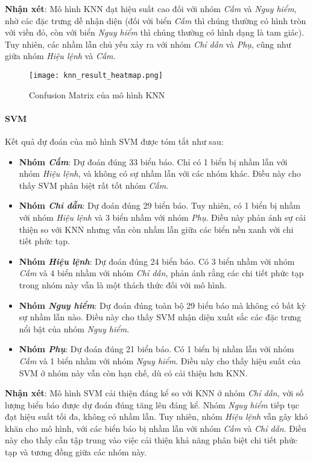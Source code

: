 \documentclass[a4paper,12pt]{article}
\begin{document}
\textbf{Nhận xét}:  
Mô hình KNN đạt hiệu suất cao đối với nhóm \textit{Cấm} và \textit{Nguy hiểm}, nhờ các đặc trưng dễ nhận diện (đối với biển \textit{Cấm} thì chúng thường có hình tròn với viền đỏ, còn với biển \textit{Nguy hiểm} thì chúng thường có hình dạng là tam giác). Tuy nhiên, các nhầm lẫn chủ yếu xảy ra với nhóm \textit{Chỉ dẫn} và \textit{Phụ}, cũng như giữa nhóm \textit{Hiệu lệnh} và \textit{Cấm}.

\begin{figure}[H]
    \centering
    \texttt{[image: knn\_result\_heatmap.png]}
    \caption{Confusion Matrix của mô hình KNN}
    \label{fig:knn_confusion_matrix}
\end{figure}

\paragraph{SVM}  
Kết quả dự đoán của mô hình SVM được tóm tắt như sau:
\begin{itemize}
    \item \textbf{Nhóm \textit{Cấm}}: Dự đoán đúng 33 biển báo. Chỉ có 1 biển bị nhầm lẫn với nhóm \textit{Hiệu lệnh}, và không có sự nhầm lẫn với các nhóm khác. Điều này cho thấy SVM phân biệt rất tốt nhóm \textit{Cấm}.
    \item \textbf{Nhóm \textit{Chỉ dẫn}}: Dự đoán đúng 29 biển báo. Tuy nhiên, có 1 biển bị nhầm với nhóm \textit{Hiệu lệnh} và 3 biển nhầm với nhóm \textit{Phụ}. Điều này phản ánh sự cải thiện so với KNN nhưng vẫn còn nhầm lẫn giữa các biển nền xanh với chi tiết phức tạp.
    \item \textbf{Nhóm \textit{Hiệu lệnh}}: Dự đoán đúng 24 biển báo. Có 3 biển nhầm với nhóm \textit{Cấm} và 4 biển nhầm với nhóm \textit{Chỉ dẫn}, phản ánh rằng các chi tiết phức tạp trong nhóm này vẫn là một thách thức đối với mô hình.
    \item \textbf{Nhóm \textit{Nguy hiểm}}: Dự đoán đúng toàn bộ 29 biển báo mà không có bất kỳ sự nhầm lẫn nào. Điều này cho thấy SVM nhận diện xuất sắc các đặc trưng nổi bật của nhóm \textit{Nguy hiểm}.
    \item \textbf{Nhóm \textit{Phụ}}: Dự đoán đúng 21 biển báo. Có 1 biển bị nhầm lẫn với nhóm \textit{Cấm} và 1 biển nhầm với nhóm \textit{Nguy hiểm}. Điều này cho thấy hiệu suất của SVM ở nhóm này vẫn còn hạn chế, dù có cải thiện hơn KNN.
\end{itemize}

\textbf{Nhận xét}:  
Mô hình SVM cải thiện đáng kể so với KNN ở nhóm \textit{Chỉ dẫn}, với số lượng biển báo được dự đoán đúng tăng lên đáng kể. Nhóm \textit{Nguy hiểm} tiếp tục đạt hiệu suất tối đa, không có nhầm lẫn. Tuy nhiên, nhóm \textit{Hiệu lệnh} vẫn gây khó khăn cho mô hình, với các biển báo bị nhầm lẫn với nhóm \textit{Cấm} và \textit{Chỉ dẫn}. Điều này cho thấy cần tập trung vào việc cải thiện khả năng phân biệt chi tiết phức tạp và tương đồng giữa các nhóm này.
\end{document}
